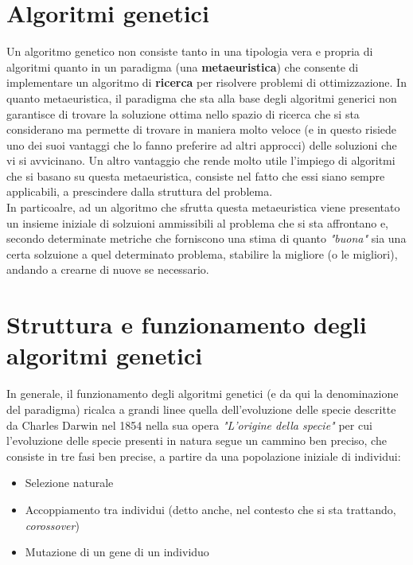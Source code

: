 \section{Algoritmi genetici}
    Un algoritmo genetico non consiste tanto in una tipologia vera e propria di algoritmi quanto in un paradigma (una \textbf{metaeuristica}) che consente di implementare un algoritmo di \textbf{ricerca} per risolvere problemi di ottimizzazione. In quanto metaeuristica, il paradigma che sta alla base degli algoritmi generici non garantisce di trovare la soluzione ottima nello spazio di ricerca che si sta considerano ma permette di trovare in maniera molto veloce (e in questo risiede uno dei suoi vantaggi che lo fanno preferire ad altri approcci) delle soluzioni che vi si avvicinano. Un altro vantaggio che rende molto utile l'impiego di algoritmi che si basano su questa metaeuristica, consiste nel fatto che essi siano sempre applicabili, a prescindere dalla struttura del problema. \\
    In particoalre, ad un algoritmo che sfrutta questa metaeuristica viene presentato un insieme iniziale di solzuioni ammissibili al problema che si sta affrontano e, secondo determinate metriche che forniscono una stima di quanto \textit{"buona"} sia una certa solzuione a quel determinato problema, stabilire la migliore (o le migliori), andando a crearne di nuove se necessario.

\section{Struttura e funzionamento degli algoritmi genetici}
    In generale, il funzionamento degli algoritmi genetici (e da qui la denominazione del paradigma) ricalca a grandi linee quella dell'evoluzione delle specie descritte da Charles Darwin nel 1854 nella sua opera \textit{"L'origine della specie"} per cui l'evoluzione delle specie presenti in natura segue un cammino ben preciso, che consiste in tre fasi ben precise, a partire da una popolazione iniziale di individui:

    \begin{itemize}
        \item Selezione naturale
        \item Accoppiamento tra individui (detto anche, nel contesto che si sta trattando, \textit{corossover})
        \item Mutazione di un gene di un individuo
    \end{itemize}

